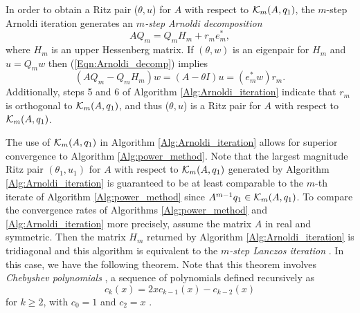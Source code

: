 \begin{enumerate}
In order to obtain a Ritz pair ($\theta, u$) for $A$ with respect to ${\mathcal K}_m(A, q_1)$, the $m$-step Arnoldi iteration generates an \textit{$m$-step Arnoldi decomposition}
\begin{equation} 		\label{Eqn:Arnoldi_decomp}
AQ_m = Q_m H_m + r_m e_m^*,
\end{equation}
where $H_m$ is an upper Hessenberg matrix.  If $(\theta, w)$ is an eigenpair for $H_m$ and $u = Q_mw$ then (\ref{Eqn:Arnoldi_decomp}) implies
\begin{equation} 			\label{Eqn:Arnoldi_decomp_Ritz_pairs}
(AQ_m - Q_mH_m)w = (A-\theta I) u = (e_m^*w)r_m.
\end{equation}
Additionally, steps 5 and 6 of Algorithm \ref{Alg:Arnoldi_iteration} indicate that $r_m$ is orthogonal to ${\mathcal K}_m(A, q_1)$, and thus ($\theta, u$) is a Ritz pair for $A$ with respect to ${\mathcal K}_m(A, q_1)$.  


The use of ${\mathcal K}_m(A, q_1)$ in Algorithm \ref{Alg:Arnoldi_iteration} allows for superior convergence to Algorithm \ref{Alg:power_method}.  Note that the largest magnitude Ritz pair $(\theta_1, u_1)$ for $A$ with respect to ${\mathcal K}_m(A, q_1)$ generated by Algorithm \ref{Alg:Arnoldi_iteration}  is guaranteed to be at least comparable to the $m$-th iterate of Algorithm \ref{Alg:power_method} since $A^{m-1}q_1 \in  {\mathcal K}_m(A, q_1)$.  To compare the convergence rates of Algorithms \ref{Alg:power_method} and \ref{Alg:Arnoldi_iteration} more precisely, assume the matrix $A$ in real and symmetric.  Then the matrix $H_m$ returned by Algorithm \ref{Alg:Arnoldi_iteration} is tridiagonal and this algorithm is equivalent to the \textit{$m$-step Lanczos iteration} \cite[Algorithm 10.1.1]{golub2012matrix}.  In this case, we have the following theorem.  Note that this theorem involves \textit{Chebyshev polynomials} \cite[Section 4.4]{saad2011numerical}, a sequence of polynomials defined recursively as
\begin{equation} 			\label{Def:Chebyshev_polys}
c_k(x) = 2x c_{k-1}(x) - c_{k-2}(x)
\end{equation}
for $k \geq 2$, with $c_0 = 1$ and $c_2 = x$ .


\end{enumerate}

